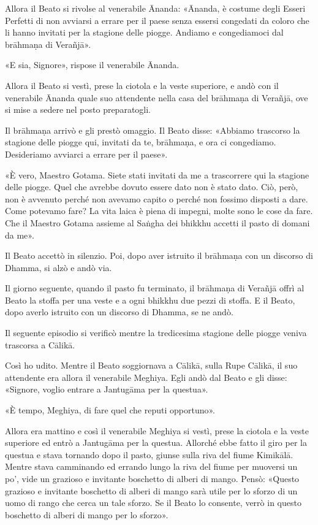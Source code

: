 Allora il Beato si rivolse al venerabile Ānanda: «Ānanda, è costume
degli Esseri Perfetti di non avviarsi a errare per il paese senza
essersi congedati da coloro che li hanno invitati per la stagione delle
piogge. Andiamo e congediamoci dal brāhmaṇa di Verañjā».


«E sia, Signore», rispose il venerabile Ānanda.


Allora il Beato si vestì, prese la ciotola e la veste superiore, e andò
con il venerabile Ānanda quale suo attendente nella casa del brāhmaṇa di
Verañjā, ove si mise a sedere nel posto preparatogli.


Il brāhmaṇa arrivò e gli prestò omaggio. Il Beato disse: «Abbiamo
trascorso la stagione delle piogge qui, invitati da te, brāhmaṇa, e ora
ci congediamo. Desideriamo avviarci a errare per il paese».


«È vero, Maestro Gotama. Siete stati invitati da me a trascorrere qui la
stagione delle piogge. Quel che avrebbe dovuto essere dato non è stato
dato. Ciò, però, non è avvenuto perché non avevamo capito o perché non
fossimo disposti a dare. Come potevamo fare? La vita laica è piena di
impegni, molte sono le cose da fare. Che il Maestro Gotama assieme al
Saṅgha dei bhikkhu accetti il pasto di domani da me».


Il Beato accettò in silenzio. Poi, dopo aver istruito il brāhmaṇa con un
discorso di Dhamma, si alzò e andò via.


Il giorno seguente, quando il pasto fu terminato, il brāhmaṇa di Verañjā
offrì al Beato la stoffa per una veste e a ogni bhikkhu due pezzi di
stoffa. E il Beato, dopo averlo istruito con un discorso di Dhamma, se
ne andò.




 Il seguente episodio si verificò mentre la
tredicesima stagione delle piogge veniva trascorsa a Cālikā.


 Così ho udito. Mentre il Beato soggiornava a Cālikā, sulla
Rupe Cālikā, il suo attendente era allora il venerabile Meghiya. Egli
andò dal Beato e gli disse: «Signore, voglio entrare a Jantugāma per la
questua».


«È tempo, Meghiya, di fare quel che reputi opportuno».


Allora era mattino e così il venerabile Meghiya si vestì, prese la
ciotola e la veste superiore ed entrò a Jantugāma per la questua.
Allorché ebbe fatto il giro per la questua e stava tornando dopo il
pasto, giunse sulla riva del fiume Kimikālā. Mentre stava camminando ed
errando lungo la riva del fiume per muoversi un po’, vide un grazioso e
invitante boschetto di alberi di mango. Pensò: «Questo grazioso e
invitante boschetto di alberi di mango sarà utile per lo sforzo di un
uomo di rango che cerca un tale sforzo. Se il Beato lo consente, verrò
in questo boschetto di alberi di mango per lo sforzo».


